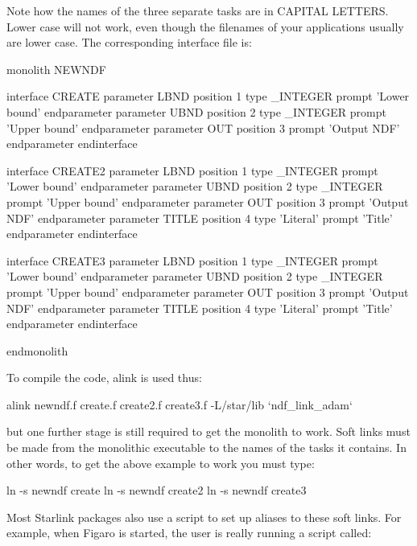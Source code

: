 \documentclass[11pt,nolof]{starlink}
\begin{document}
Note how the names of the three separate tasks are in CAPITAL LETTERS.
Lower case will not work, even though the filenames of your applications
usually are lower case. The corresponding interface file is:

\begin{small}
\begin{terminalv}
monolith NEWNDF

interface CREATE
  parameter LBND
    position 1
    type _INTEGER
    prompt 'Lower bound'
  endparameter
  parameter UBND
    position 2
    type _INTEGER
    prompt 'Upper bound'
  endparameter
  parameter OUT
    position 3
    prompt 'Output NDF'
  endparameter
endinterface

interface CREATE2
  parameter LBND
    position 1
    type _INTEGER
    prompt 'Lower bound'
  endparameter
  parameter UBND
    position 2
    type _INTEGER
    prompt 'Upper bound'
  endparameter
  parameter OUT
    position 3
    prompt 'Output NDF'
  endparameter
  parameter TITLE
    position 4
    type 'Literal'
    prompt 'Title'
  endparameter
endinterface

interface CREATE3
  parameter LBND
    position 1
    type _INTEGER
    prompt 'Lower bound'
  endparameter
  parameter UBND
    position 2
    type _INTEGER
    prompt 'Upper bound'
  endparameter
  parameter OUT
    position 3
    prompt 'Output NDF'
  endparameter
  parameter TITLE
    position 4
    type 'Literal'
    prompt 'Title'
  endparameter
endinterface

endmonolith
\end{terminalv}
\end{small}

To compile the code, \textsf{alink} is used thus:

\begin{terminalv}
alink newndf.f create.f create2.f create3.f -L/star/lib `ndf_link_adam`
\end{terminalv}

but one further stage is still required to get the monolith to work. Soft
links must be made from the monolithic executable to the names of the
tasks it contains. In other words, to get the above example to work you
must type:

\begin{terminalv}
ln -s newndf create
ln -s newndf create2
ln -s newndf create3
\end{terminalv}

Most Starlink packages also use a script to set up aliases to these
soft links. For example, when Figaro is started, the user is really
running a script called:
\end{document}
